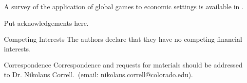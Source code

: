\documentclass{nature}
\begin{document}
\cite{Krieger2000}

\cite{Kube2000}

A survey of the application of global games to economic settings is available in \cite{Morris2000}.

\cite{Pynadath2002}

\cite{Conradt2003}

\cite{Mataric2003}

\cite{Gerkey2003}

\cite{Gerkey2004}

\cite{Conradt2005}

\cite{Raafat2009}

\cite{Yoshida2010}

\cite{Suzuki2015}






\begin{addendum}
 \item Put acknowledgements here.
 \item[Competing Interests] The authors declare that they have no
competing financial interests.
 \item[Correspondence] Correspondence and requests for materials
should be addressed to Dr. Nikolaus Correll.~(email: nikolaus.correll@colorado.edu).
\end{addendum}

\end{document}
